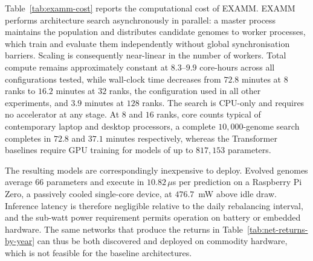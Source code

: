 Table~\ref{tab:examm-cost} reports the computational cost of EXAMM. EXAMM performs architecture search asynchronously in parallel: a master process maintains the population and distributes candidate genomes to worker processes, which train and evaluate them independently without global synchronisation barriers. Scaling is consequently near-linear in the number of workers. Total compute remains approximately constant at $8.3$--$9.9$ core-hours across all configurations tested, while wall-clock time decreases from $72.8$ minutes at $8$ ranks to $16.2$ minutes at $32$ ranks, the configuration used in all other experiments, and $3.9$ minutes at $128$ ranks. The search is CPU-only and requires no accelerator at any stage. At $8$ and $16$ ranks, core counts typical of contemporary laptop and desktop processors, a complete $10{,}000$-genome search completes in $72.8$ and $37.1$ minutes respectively, whereas the Transformer baselines require GPU training for models of up to $817{,}153$ parameters.

The resulting models are correspondingly inexpensive to deploy. Evolved genomes average $66$ parameters and execute in $10.82\,\mu$s per prediction on a Raspberry Pi Zero, a passively cooled single-core device, at $476.7$~mW above idle draw. Inference latency is therefore negligible relative to the daily rebalancing interval, and the sub-watt power requirement permits operation on battery or embedded hardware. The same networks that produce the returns in Table~\ref{tab:net-returns-by-year} can thus be both discovered and deployed on commodity hardware, which is not feasible for the baseline architectures.

